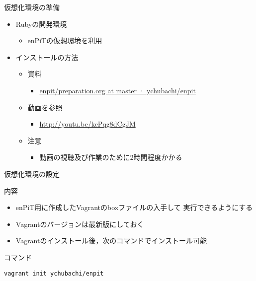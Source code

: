 \documentclass[t, aspectratio=169]{beamer}
\begin{document}
\begin{frame}[label=sec-1-3-3]{仮想化環境の準備}
\begin{itemize}
\item Rubyの開発環境
\begin{itemize}
\item enPiTの仮想環境を利用
\end{itemize}
\item インストールの方法
\begin{itemize}
\item 資料
\begin{itemize}
\item \href{https://github.com/ychubachi/enpit/blob/master/slides/preparation.org}{enpit/preparation.org at master · ychubachi/enpit}
\end{itemize}
\item 動画を参照
\begin{itemize}
\item \url{http://youtu.be/kePqg8dCgJM}
\end{itemize}
\item 注意
\begin{itemize}
\item 動画の視聴及び作業のために2時間程度かかる
\end{itemize}
\end{itemize}
\end{itemize}
\end{frame}

\begin{frame}[fragile,label=sec-1-3-4]{仮想化環境の設定}
 \begin{block}{内容}
\begin{itemize}
\item enPiT用に作成したVagrantのboxファイルの入手して
実行できるようにする
\item Vagrantのバージョンは最新版にしておく
\item Vagrantのインストール後，次のコマンドでインストール可能
\end{itemize}
\end{block}

\begin{block}{コマンド}
\begin{verbatim}
vagrant init ychubachi/enpit
\end{verbatim}
\end{block}
\end{frame}
\end{document}
